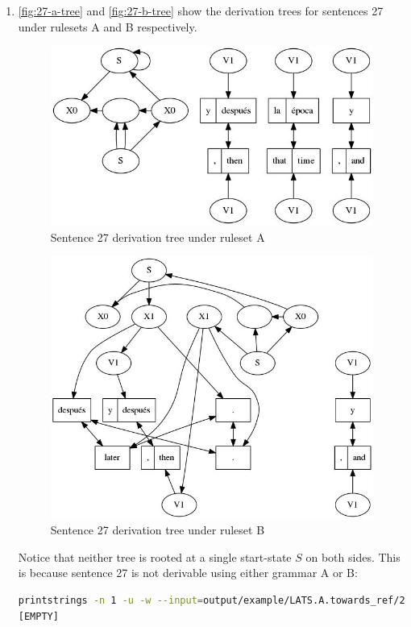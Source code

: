 \documentclass[a4paper,oneside,reqno]{amsart}
\begin{document}
\begin{enumerate}[label=\arabic*.]
  \item
    \autoref{fig:27-a-tree} and \autoref{fig:27-b-tree} show the derivation
    trees for sentences 27 under rulesets A and B respectively.
    \begin{figure}[H]
      \begin{center}
        \includegraphics[scale=0.5]{../output/tree27Advn1.jpg}
      \end{center}
      \caption{Sentence 27 derivation tree under ruleset A}
      \label{fig:27-a-tree}
    \end{figure}
    \begin{figure}[H]
      \begin{center}
        \includegraphics[scale=0.5]{../output/tree27Bdvn1.jpg}
      \end{center}
      \caption{Sentence 27 derivation tree under ruleset B}
      \label{fig:27-b-tree}
    \end{figure}
    Notice that neither tree is rooted at a single start-state $S$ on both
    sides. This is because sentence 27 is not derivable using either grammar A
    or B:
    \begin{lstlisting}[language=bash]
printstrings -n 1 -u -w --input=output/example/LATS.A.towards_ref/27.fst.gz 2>/dev/null
[EMPTY]


\end{lstlisting}
\end{enumerate}
\end{document}
